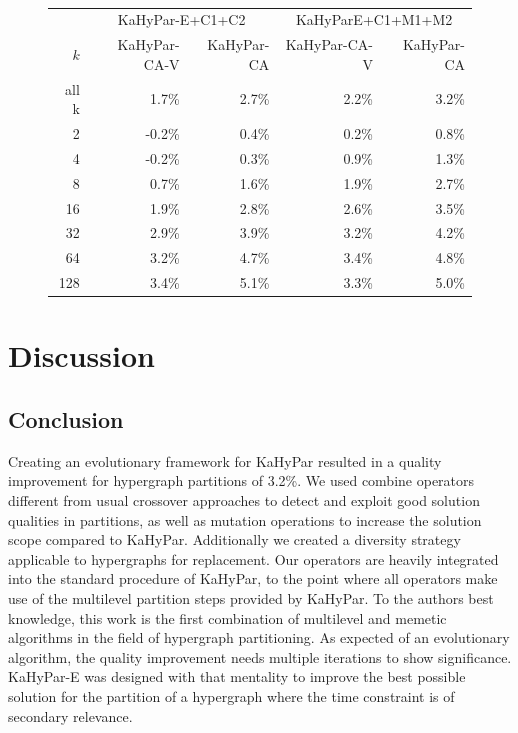 \documentclass[a4paper,12pt,titlepage, BCOR7mm,headsepline]{scrbook}
\numberwithin{equation}{section}
\begin{document}
\begin{figure}[t]


\centering
\vspace{0pt}
~\label{tbl:imp}
\begin{tabular}{r||r|r||r|r}
&\multicolumn{2}{c||}{KaHyPar-E+C1+C2} & \multicolumn{2}{c}{KaHyParE+C1+M1+M2} \\
$k$                     &                              KaHyPar-CA-V    & KaHyPar-CA &  KaHyPar-CA-V   & KaHyPar-CA  \\ 
                     \hline
                     \hline

all k &  1.7\% & 2.7\% & 2.2\% & 3.2\% \\
\hline
2&-0.2\% & 0.4\% & 0.2\% & 0.8\% \\
4& -0.2\% &0.3\% &0.9\% &1.3\%\\
8& 0.7\% &1.6\%& 1.9\% &2.7\%\\
16& 1.9\% &2.8\%& 2.6\%& 3.5\%\\
32& 2.9\% &3.9\%& 3.2\%& 4.2\%\\
64&  3.2\% &4.7\%& 3.4\% &4.8\%\\
128& 3.4\% &5.1\%& 3.3\% &5.0\%  
\end{tabular}

\end{figure}








\chapter{Discussion}
\section{Conclusion}
Creating an evolutionary framework for KaHyPar resulted in a quality improvement for hypergraph partitions of 3.2\%. We used combine operators different from usual crossover approaches to detect and exploit good solution qualities in partitions, as well as mutation operations to increase the solution scope compared to KaHyPar. Additionally we created a diversity strategy applicable to hypergraphs for replacement. Our operators are heavily integrated into the standard procedure of KaHyPar, to the point where all operators make use of the multilevel partition steps provided by KaHyPar. To the authors best knowledge, this work is the first combination of multilevel and memetic algorithms in the field of hypergraph partitioning.
As expected of an evolutionary algorithm, the quality improvement needs multiple iterations to show significance. KaHyPar-E was designed with that mentality to improve the best possible solution for the partition of a hypergraph where the time constraint is of secondary relevance. 
\end{document}
